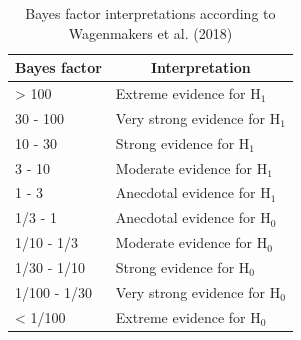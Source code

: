 \documentclass[
  doc,floatsintext]{apa6}
\begin{document}
\begin{table}[tbp]

\begin{center}
\begin{threeparttable}

\caption{\label{tab:unnamed-chunk-4}Bayes factor interpretations according to Wagenmakers et al. (2018)}

\begin{tabular}{ll}
\toprule
Bayes factor & \multicolumn{1}{c}{Interpretation}\\
\midrule
> 100 & Extreme evidence for H$_{1}$\\
30 - 100 & Very strong evidence for H$_{1}$\\
10 - 30 & Strong evidence for H$_{1}$\\
3 - 10 & Moderate evidence for H$_{1}$\\
1 - 3 & Anecdotal evidence for H$_{1}$\\
1/3 - 1 & Anecdotal evidence for H$_{0}$\\
1/10 - 1/3 & Moderate evidence for H$_{0}$\\
1/30 - 1/10 & Strong evidence for H$_{0}$\\
1/100 - 1/30 & Very strong evidence for H$_{0}$\\
< 1/100 & Extreme evidence for H$_{0}$\\
\bottomrule
\end{tabular}

\end{threeparttable}
\end{center}

\end{table}

\clearpage
\end{document}
